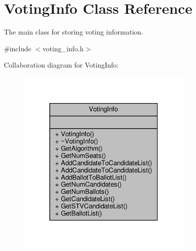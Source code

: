\hypertarget{classVotingInfo}{}\section{Voting\+Info Class Reference}
\label{classVotingInfo}


The main class for storing voting information.  




{\ttfamily \#include $<$voting\+\_\+info.\+h$>$}



Collaboration diagram for Voting\+Info\+:
\nopagebreak
\begin{figure}[H]
\begin{center}
\leavevmode
\includegraphics[width=244pt]{classVotingInfo__coll__graph}
\end{center}
\end{figure}

